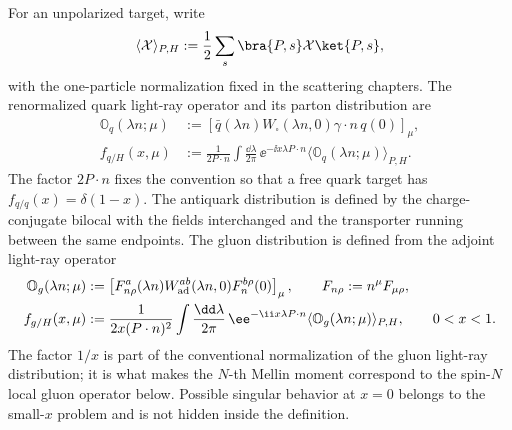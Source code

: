 For an unpolarized target, write
\[
  \langle \mathcal X\rangle_{P,H}
  :=
  \frac12\sum_s\bra{P,s}\mathcal X\ket{P,s},
\]
with the one-particle normalization fixed in the scattering chapters.  The
renormalized quark light-ray operator and its parton distribution are
\begin{align}
  \mathbb O_q(\lambda n;\mu)
  &:=
  \left[
    \bar q(\lambda n)W_{\square}(\lambda n,0)\gamma\cdot n\,q(0)
  \right]_{\mu},
  \label{eq:qcd-quark-light-ray-operator}\\
  f_{q/H}(x,\mu)
  &:=
  \frac1{2P\cdot n}
  \int\frac{\dd\lambda}{2\pi}\,
  \ee^{-\ii x\lambda P\cdot n}
  \langle\mathbb O_q(\lambda n;\mu)\rangle_{P,H}.
  \label{eq:pdf-light-ray-definition}
\end{align}
The factor \(2P\cdot n\) fixes the convention so that a free quark target has
\(f_{q/q}(x)=\delta(1-x)\).  The antiquark distribution is defined by the
charge-conjugate bilocal with the fields interchanged and the transporter
running between the same endpoints.  The gluon distribution is defined from
the adjoint light-ray operator
\begin{align}
  \mathbb O_g(\lambda n;\mu)
  &:=
  \left[
    F^a_{n\rho}(\lambda n)
    W_{\rm ad}^{ab}(\lambda n,0)
    F_n^{b\rho}(0)
  \right]_{\mu},
  \qquad
  F_{n\rho}:=n^\mu F_{\mu\rho},
  \label{eq:qcd-gluon-light-ray-operator}\\
  f_{g/H}(x,\mu)
  &:=
  \frac1{2x(P\cdot n)^2}
  \int\frac{\dd\lambda}{2\pi}\,
  \ee^{-\ii x\lambda P\cdot n}
  \langle\mathbb O_g(\lambda n;\mu)\rangle_{P,H},
  \qquad 0<x<1 .
  \label{eq:qcd-gluon-pdf-definition}
\end{align}
The factor \(1/x\) is part of the conventional normalization of the gluon
light-ray distribution; it is what makes the \(N\)-th Mellin moment correspond
to the spin-\(N\) local gluon operator below.  Possible singular behavior at
\(x=0\) belongs to the small-\(x\) problem and is not hidden inside the
definition.

